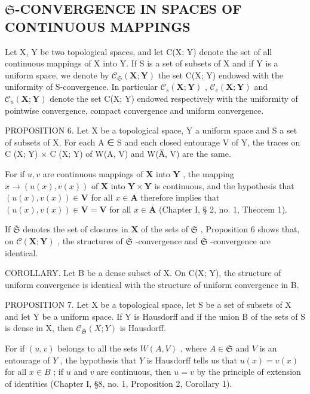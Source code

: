 \subsection{\texorpdfstring{\(\mathfrak{S}\)-CONVERGENCE IN SPACES OF CONTINUOUS MAPPINGS}{S-CONVERGENCE IN SPACES OF CONTINUOUS MAPPINGS}}

Let X, Y be two topological spaces, and let C(X; Y) denote the set of all continuous mappings of X into Y. If S is a set of subsets of X and if Y is a uniform space, we denote by \(\mathcal{C}_{\mathfrak{S}}(\mathbf{X};\mathbf{Y})\) the set C(X; Y) endowed with the uniformity of S-convergence. In particular \(\mathcal{C}_{s}(\mathbf{X};\mathbf{Y})\) , \(\mathcal{C}_{c}(\mathbf{X};\mathbf{Y})\) and \(\mathcal{C}_{u}(\mathbf{X};\mathbf{Y})\) denote the set C(X; Y) endowed respectively with the uniformity of pointwise convergence, compact convergence and uniform convergence.

PROPOSITION 6. Let X be a topological space, Y a uniform space and S a set of subsets of X. For each A ∈ S and each closed entourage V of Y, the traces on C (X; Y) × C (X; Y) of W(A, V) and W(A̅, V) are the same.

For if \(u, v\) are continuous mappings of \(\mathbf{X}\) into \(\mathbf{Y}\) , the mapping \(x \to (u(x), v(x))\) of \(\mathbf{X}\) into \(\mathbf{Y} \times \mathbf{Y}\) is continuous, and the hypothesis that \((u(x), v(x)) \in \mathbf{V}\) for all \(x \in \mathbf{A}\) therefore implies that \((u(x), v(x)) \in \overline{\mathbf{V}} = \mathbf{V}\) for all \(x \in \overline{\mathbf{A}}\) (Chapter I, § 2, no. 1, Theorem 1).

If \(\overline{\mathfrak{S}}\) denotes the set of closures in \(\mathbf{X}\) of the sets of \(\mathfrak{S}\) , Proposition 6 shows that, on \(\mathcal{C}(\mathbf{X};\mathbf{Y})\) , the structures of \(\mathfrak{S}\) -convergence and \(\overline{\mathfrak{S}}\) -convergence are identical.

COROLLARY. Let B be a dense subset of X. On C(X; Y), the structure of uniform convergence is identical with the structure of uniform convergence in B.

PROPOSITION 7. Let X be a topological space, let S be a set of subsets of X and let Y be a uniform space. If Y is Hausdorff and if the union B of the sets of S is dense in X, then \(\mathcal{C}_{\mathfrak{S}}(X;Y)\) is Hausdorff.

For if \((u, v)\) belongs to all the sets \(W(A, V)\) , where \(A \in \mathfrak{S}\) and \(V\) is an entourage of \(Y\) , the hypothesis that \(Y\) is Hausdorff tells us that \(u(x) = v(x)\) for all \(x \in B\) ; if \(u\) and \(v\) are continuous, then \(u = v\) by the principle of extension of identities (Chapter I, §8, no. 1, Proposition 2, Corollary 1).

